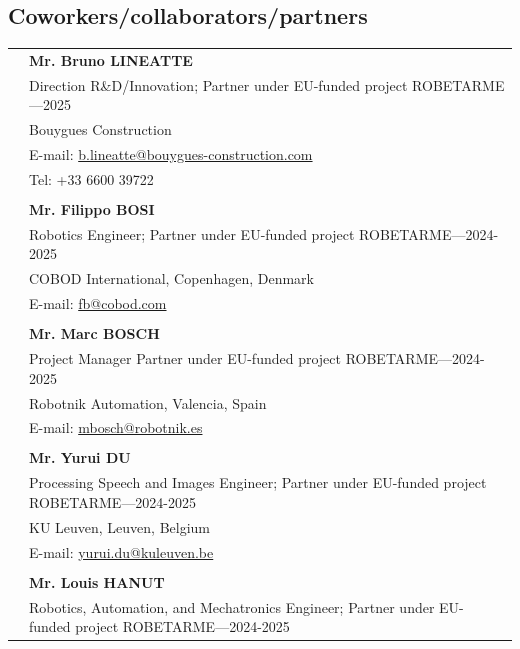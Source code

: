 \documentclass[a4paper,10pt,twoside]{article}
\begin{document}
\vspace{2em}

\subsection*{Coworkers/collaborators/partners}
\vspace{0.5cm}
\begin{tabular}{rp{14cm}}
& \textbf{Mr. Bruno LINEATTE} \\
& {Direction R\&D/Innovation; Partner under EU-funded project ROBETARME}---2025\\
&Bouygues Construction \\
& E-mail: \href{b.lineatte@bouygues-construction.com}{b.lineatte@bouygues-construction.com}\\
& Tel: +33 6600 39722\\
&\\
& \textbf{Mr. Filippo BOSI} \\
& {Robotics Engineer; Partner under EU-funded project ROBETARME}---2024-2025\\
&COBOD International, Copenhagen, Denmark \\
& E-mail: \href{mailto: fb@cobod.com}{fb@cobod.com}\\
&\\
& \textbf{Mr. Marc BOSCH} \\
& {Project Manager Partner under EU-funded project ROBETARME}---2024-2025\\
&Robotnik Automation, Valencia, Spain\\
& E-mail: \href{mailto: mbosch@robotnik.es}{mbosch@robotnik.es}\\
&\\
& \textbf{Mr. Yurui DU} \\
& {Processing Speech and Images Engineer; Partner under EU-funded project ROBETARME}---2024-2025\\
&KU Leuven, Leuven, Belgium \\
& E-mail: \href{mailto: yurui.du@kuleuven.be}{yurui.du@kuleuven.be}\\
&\\
& \textbf{Mr. Louis HANUT} \\
& {Robotics, Automation, and Mechatronics Engineer; Partner under EU-funded project ROBETARME}---2024-2025\\

\end{tabular}
\end{document}
